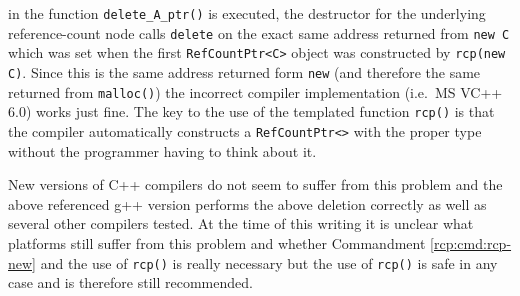 {}\noindent{}in the function {}\texttt{delete\_A\_ptr()} is executed,
the destructor for the underlying reference-count node calls
{}\texttt{delete} on the exact same address returned from
{}\texttt{new C} which was set when the first
{}\texttt{RefCountPtr<C>} object was constructed by {}\texttt{rcp(new
C)}.  Since this is the same address returned form {}\texttt{new} (and
therefore the same returned from {}\texttt{malloc()}) the incorrect
compiler implementation (i.e.~MS VC++ 6.0) works just fine.  The key
to the use of the templated function {}\texttt{rcp()} is that the
compiler automatically constructs a {}\texttt{RefCountPtr<>} with the
proper type without the programmer having to think about it.

New versions of C++ compilers do not seem to suffer from this problem
and the above referenced g++ version performs the above deletion
correctly as well as several other compilers tested.  At the time of
this writing it is unclear what platforms still suffer from this
problem and whether Commandment \ref{rcp:cmd:rcp-new} and the use of
{}\texttt{rcp()} is really necessary but the use of {}\texttt{rcp()}
is safe in any case and is therefore still recommended.
